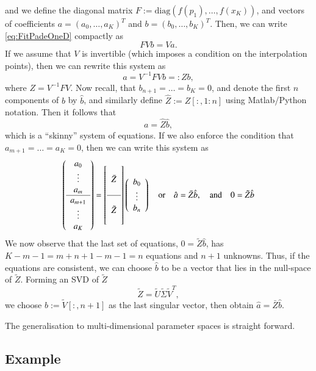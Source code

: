 and we define the diagonal matrix $F := \text{diag}(f(p_1), \ldots, f(x_K))$, and
vectors of coefficients $a=(a_0,\ldots,a_K)^T$ and $b=(b_0,\ldots,b_K)^T$. Then,
we can write \eqref{eq:FitPadeOneD} compactly as
\[ F V b = V a . \]
If we assume that $V$ is invertible (which imposes a condition on the interpolation points),
then we can rewrite this system as
\[ a = V^{-1} F V b =: Z b , \]
where $Z = V^{-1} F V$. Now recall, that $b_{n+1} = \ldots = b_K = 0$, and denote the first
$n$ components of $b$ by $\hat{b}$, and similarly define $\hat{Z} := Z[:,1:n]$ using Matlab/Python
notation. Then it follows that
\[ a = \hat{Z} \hat{b} ,\]
which is a ``skinny'' system of equations. If we also enforce the condition that
$a_{m+1} = \ldots = a_K = 0$, then we can write this system as
\[ \left(\begin{array}{c}
     a_0 \\ \vdots \\ a_m \\ \hline a_{m+1} \\ \vdots \\ a_K
   \end{array}\right)
   =
   \left[\begin{array}{c} \\ \bar{Z} \\ \\ \hline \\ \tilde{Z} \\ \phantom{+} \end{array}\right]
   \left(\begin{array}{c}
     b_0 \\ \vdots \\ b_n
   \end{array}\right)
   \quad \text{or}\quad \hat{a} = \bar{Z} \hat{b}, \quad \text{and} \quad 0 = \tilde{Z} \hat{b}
\]
We now observe that the last set of equations, $0 = \tilde{Z} \hat{b}$, has $K-m-1=m+n+1-m-1=n$ equations
and $n+1$ unknowns. Thus, if the equations are consistent, we can choose $\hat{b}$ to be a vector that
lies in the null-space of $\tilde{Z}$. Forming an SVD of $\tilde{Z}$
\[ \tilde{Z} = \tilde{U} \tilde{\Sigma} \tilde{V}^T ,\]
we choose $\hat{b} := \tilde{V}[:,n+1]$ as the last singular vector, then obtain $\hat{a} = \bar{Z} \hat{b}$.

The generalisation to multi-dimensional parameter spaces is straight forward.


\subsection{Example}

